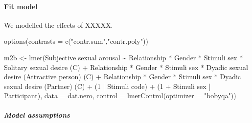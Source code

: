 \documentclass[
  bookmarksnumbered]{article}
\newenvironment{Shaded}{\begin{snugshade}}{\end{snugshade}}
\newcommand{\AttributeTok}[1]{\textcolor[rgb]{0.80,0.80,0.80}{#1}}
\newcommand{\DecValTok}[1]{\textcolor[rgb]{0.86,0.86,0.80}{#1}}
\newcommand{\FunctionTok}[1]{\textcolor[rgb]{0.94,0.94,0.56}{#1}}
\newcommand{\NormalTok}[1]{\textcolor[rgb]{0.80,0.80,0.80}{#1}}
\newcommand{\OtherTok}[1]{\textcolor[rgb]{0.94,0.94,0.56}{#1}}
\newcommand{\SpecialCharTok}[1]{\textcolor[rgb]{0.86,0.64,0.64}{#1}}
\newcommand{\StringTok}[1]{\textcolor[rgb]{0.80,0.58,0.58}{#1}}
\begin{document}
\hypertarget{fit-model-2}{%
\paragraph{Fit model}\label{fit-model-2}}

We modelled the effects of XXXXX.

\begin{Shaded}
\begin{Highlighting}[]
\FunctionTok{options}\NormalTok{(}\AttributeTok{contrasts =} \FunctionTok{c}\NormalTok{(}\StringTok{"contr.sum"}\NormalTok{,}\StringTok{"contr.poly"}\NormalTok{))}

\NormalTok{m2b }\OtherTok{\textless{}{-}} \FunctionTok{lmer}\NormalTok{(}\StringTok{\textasciigrave{}}\AttributeTok{Subjective sexual arousal}\StringTok{\textasciigrave{}} \SpecialCharTok{\textasciitilde{}}
\NormalTok{            Relationship }\SpecialCharTok{*}\NormalTok{ Gender }\SpecialCharTok{*} \StringTok{\textasciigrave{}}\AttributeTok{Stimuli sex}\StringTok{\textasciigrave{}} \SpecialCharTok{*} \StringTok{\textasciigrave{}}\AttributeTok{Solitary sexual desire (C)}\StringTok{\textasciigrave{}} \SpecialCharTok{+}
\NormalTok{            Relationship }\SpecialCharTok{*}\NormalTok{ Gender }\SpecialCharTok{*} \StringTok{\textasciigrave{}}\AttributeTok{Stimuli sex}\StringTok{\textasciigrave{}} \SpecialCharTok{*} \StringTok{\textasciigrave{}}\AttributeTok{Dyadic sexual desire (Attractive person) (C)}\StringTok{\textasciigrave{}} \SpecialCharTok{+}
\NormalTok{            Relationship }\SpecialCharTok{*}\NormalTok{ Gender }\SpecialCharTok{*} \StringTok{\textasciigrave{}}\AttributeTok{Stimuli sex}\StringTok{\textasciigrave{}} \SpecialCharTok{*} \StringTok{\textasciigrave{}}\AttributeTok{Dyadic sexual desire (Partner) (C)}\StringTok{\textasciigrave{}} \SpecialCharTok{+}
\NormalTok{            (}\DecValTok{1} \SpecialCharTok{|} \StringTok{\textasciigrave{}}\AttributeTok{Stimuli code}\StringTok{\textasciigrave{}}\NormalTok{) }\SpecialCharTok{+}
\NormalTok{            (}\DecValTok{1} \SpecialCharTok{+} \StringTok{\textasciigrave{}}\AttributeTok{Stimuli sex}\StringTok{\textasciigrave{}} \SpecialCharTok{|}\NormalTok{ Participant),}
           \AttributeTok{data =}\NormalTok{ dat.nero,}
           \AttributeTok{control =} \FunctionTok{lmerControl}\NormalTok{(}\AttributeTok{optimizer =} \StringTok{"bobyqa"}\NormalTok{))}
\end{Highlighting}
\end{Shaded}

\hypertarget{model-assumptions-2}{%
\subparagraph{Model assumptions}\label{model-assumptions-2}}
\end{document}
